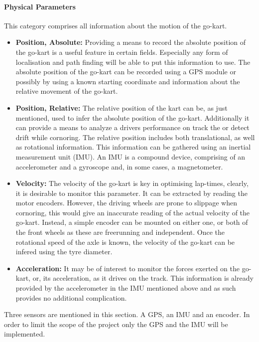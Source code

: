 \paragraph*{Physical Parameters}
This category comprises all information about the motion of the go-kart.
\begin{itemize}
	\item \textbf{Position, Absolute:} Providing a means to record the absolute position of the go-kart is a useful feature in certain fields.
	Especially any form of localisation and path finding will be able to put this information to use.
	The absolute position of the go-kart can be recorded using a GPS module or possibly by using a known starting coordinate and information about the relative movement of the go-kart.
	\item \textbf{Position, Relative:} The relative position of the kart can be, as just mentioned, used to infer the absolute position of the go-kart.
	Additionally it can provide a means to analyze a drivers performance on track the or detect drift while cornoring.
	The relative position includes both translational, as well as rotational information.
	This information can be gathered using an inertial measurement unit (IMU).
	An IMU is a compound device, comprising of an accelerometer and a gyroscope and, in some cases, a magnetometer.
	\item \textbf{Velocity:} The velocity of the go-kart is key in optimising lap-times, clearly, it is desirable to monitor this parameter.
	It can be extracted by reading the motor encoders.
	However, the driving wheels are prone to slippage when cornoring, this would give an inaccurate reading of the actual velocity of the go-kart.
	Instead, a simple encoder can be mounted on either one, or both of the front wheels as these are freerunning and independent.
	Once the rotational speed of the axle is known, the velocity of the go-kart can be infered using the tyre diameter.
	\item \textbf{Acceleration:} It may be of interest to monitor the forces exerted on the go-kart, or, its acceleration, as it drives on the track.
	This information is already provided by the accelerometer in the IMU mentioned above and as such provides no additional complication.
\end{itemize}
Three sensors are mentioned in this section.
A GPS, an IMU and an encoder.
In order to limit the scope of the project only the GPS and the IMU will be implemented.
